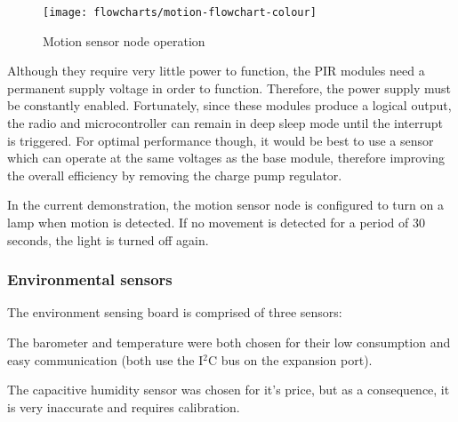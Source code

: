 
\begin{figure}[!h]
  \begin{center}
    \texttt{[image: flowcharts/motion-flowchart-colour]}
  \end{center}
  \caption{Motion sensor node operation}
  \label{fig:motion-flowchart}
\end{figure}

Although they require very little power to function, the PIR modules need a
permanent supply voltage in order to function. Therefore, the power supply must
be constantly enabled. Fortunately, since these modules produce a logical
output, the radio and microcontroller can remain in deep sleep mode until the
interrupt is triggered. For optimal performance though, it would be best to use
a sensor which can operate at the same voltages as the base module, therefore
improving the overall efficiency by removing the charge pump regulator.


In the current demonstration, the motion sensor node is configured to turn on a
lamp when motion is detected. If no movement is detected for a period of 30
seconds, the light is turned off again.


\subsubsection{Environmental sensors}

The environment sensing board is comprised of three sensors:



The barometer and temperature were both chosen for their low consumption and
easy communication (both use the I$^{2}$C bus on the expansion port).

The capacitive humidity sensor was chosen for it's price, but as a consequence,
it is very inaccurate and requires calibration.

